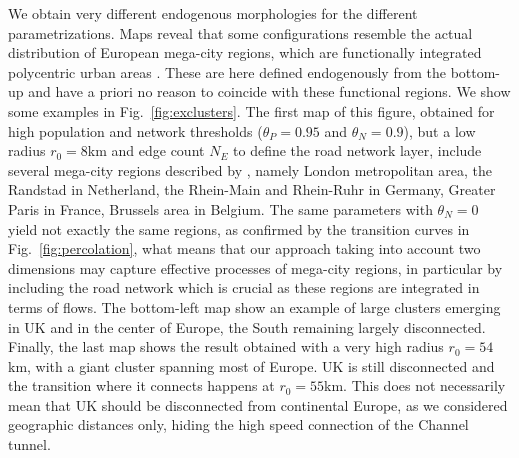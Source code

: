 \documentclass{jimis-en}
\begin{document}
We obtain very different endogenous morphologies for the different parametrizations. Maps reveal that some configurations resemble the actual distribution of European mega-city regions, which are functionally integrated polycentric urban areas \citep{hall2006polycentric}. These are here defined endogenously from the bottom-up and have a priori no reason to coincide with these functional regions. We show some examples in Fig.~\ref{fig:exclusters}. The first map of this figure, obtained for high population and network thresholds ($\theta_P = 0.95$ and $\theta_N = 0.9$), but a low radius $r_0 = 8$km and edge count $N_E$ to define the road network layer, include several mega-city regions described by \citep{hall2006polycentric}, namely London metropolitan area, the Randstad in Netherland, the Rhein-Main and Rhein-Ruhr in Germany, Greater Paris in France, Brussels area in Belgium. The same parameters with $\theta_N = 0$ yield not exactly the same regions, as confirmed by the transition curves in Fig.~\ref{fig:percolation}, what means that our approach taking into account two dimensions may capture effective processes of mega-city regions, in particular by including the road network which is crucial as these regions are integrated in terms of flows. The bottom-left map show an example of large clusters emerging in UK and in the center of Europe, the South remaining largely disconnected. Finally, the last map shows the result obtained with a very high radius $r_0 = 54$km, with a giant cluster spanning most of Europe. UK is still disconnected and the transition where it connects happens at $r_0 = 55$km. This does not necessarily mean that UK should be disconnected from continental Europe, as we considered geographic distances only, hiding the high speed connection of the Channel tunnel.
\end{document}
